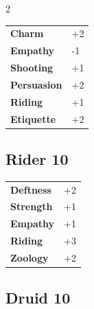 \begin{multicols}{2}
\begin{tcolorbox}
\vspace{3mm}

\begin{tabular}{@{}ll@{}}
    \textbf{Charm} & +2\\
    \textbf{Empathy} & -1\\
    \textbf{Shooting} & +1\\
    \textbf{Persuasion} & +2\\
    \textbf{Riding} & +1\\
    \textbf{Etiquette} & +2\\
\end{tabular}


\end{tcolorbox}

\begin{tcolorbox}
    \subsection*{Rider \hfill \small{10 }}
    \tcblower




\begin{tabular}{@{}ll@{}}
    \textbf{Deftness} & +2\\
    \textbf{Strength} & +1\\
    \textbf{Empathy} & +1\\
    \textbf{Riding} & +3\\
    \textbf{Zoology} & +2\\
\end{tabular}


\end{tcolorbox}

\begin{tcolorbox}
    \subsection*{Druid \hfill \small{10 }}
    \tcblower



\end{tcolorbox}
\end{multicols}
